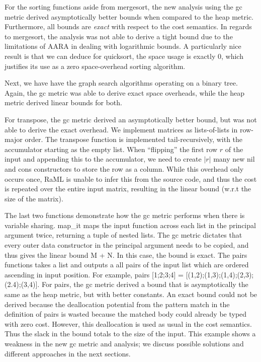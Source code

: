 \documentclass{easychair}
\theoremstyle{definition}
\begin{document}
For the sorting functions aside from mergesort, the new analysis using the gc metric
derived asymptotically better bounds when compared to the heap metric. Furthermore,
all bounds are \emph{exact} with respect to the cost semantics. In regards to mergesort, 
the analysis was not able to derive a tight bound due to the limitations of AARA in dealing 
with logarithmic bounds. A particularly nice result is that we can deduce for quicksort, 
the space usage is exactly 0, which justifies its use as a zero space-overhead sorting algorithm.

Next, we have have the graph search algorithms operating on a binary tree. Again, the gc metric
was able to derive exact space overheads, while the heap metric derived linear bounds for both.

For transpose, the gc metric derived an asymptotically better bound, but was not able to derive 
the exact overhead. We implement matrices as lists-of-lists in row-major order. 
The transpose function is implemented tail-recursively, with the accumulator starting as the 
empty list. When ``flipping'' the first row $r$ of the input and appending this to the accumulator, 
we need to create $|r|$ many new nil and cons constructors to store the row as a column. While this
overhead only occurs once, RaML is unable to infer this from the source code, and thus the cost
is repeated over the entire input matrix, resulting in the linear bound (w.r.t the size of the 
matrix). 

The last two functions demonstrate how the gc metric performs when there is variable sharing.
map\_it maps the input function across each list in the principal argument twice, returning a
tuple of nested lists. The gc metric dictates that every outer data constructor in the 
principal argument needs to be copied, and thus gives the linear bound M + N. In this case,
the bound is exact. The pairs functions takes a list and outputs a all pairs of the input list 
which are ordered ascending in input position. For example, 
pairs [1;2;3;4] = [(1,2);(1,3);(1,4);(2,3);(2.4);(3,4)]. For pairs, the gc metric derived a bound
that is asymptotically the same as the heap metric, but with better constants. An exact bound 
could not be derived because the deallocation potential from the pattern match in the 
definition of pairs is wasted because the matched body could already be typed with zero cost. 
However, this deallocation is used as usual in the cost semantics. Thus the slack in the bound 
totals to the size of the input. This example shows a weakness in the new gc metric and analysis; 
we discuss possible solutions and different approaches in the next sections. 
\end{document}
